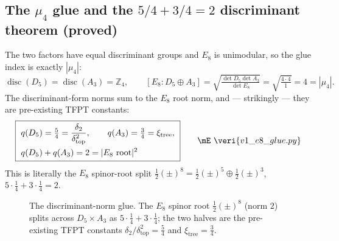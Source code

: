 \documentclass[11pt,a4paper]{article}
\newcommand{\dtop}{\delta_{\mathrm{top}}}
\newcommand{\dtwo}{\delta_2}
\theoremstyle{definition}
\begin{document}
\subsection{The $\mu_4$ glue and the $5/4+3/4=2$ discriminant theorem (proved)}
The two factors have equal discriminant groups and $E_8$ is unimodular, so the glue index is exactly
$|\mu_4|$:
\begin{equation}
  \operatorname{disc}(D_5)=\operatorname{disc}(A_3)=\mathbb Z_4,\qquad
  [E_8:D_5\oplus A_3]=\sqrt{\tfrac{\det D_5\det A_3}{\det E_8}}=\sqrt{\tfrac{4\cdot4}{1}}=4=|\mu_4| .
\end{equation}
The discriminant-form norms sum to the $E_8$ root norm, and --- strikingly --- they are pre-existing
TFPT constants:
\begin{equation}
  \boxed{\ \begin{aligned}
    &q(D_5)=\tfrac54=\frac{\dtwo}{\dtop^2},\qquad q(A_3)=\tfrac34=\xi_{\mathrm{tree}},\\
    &q(D_5)+q(A_3)=2=|\text{$E_8$ root}|^2
  \end{aligned}\ }\qquad\mE\ \veri{v1\_e8\_glue.py}
\end{equation}
This is literally the $E_8$ spinor-root split $\tfrac12(\pm)^8=\tfrac12(\pm)^5\oplus\tfrac12(\pm)^3$,
$5\cdot\tfrac14+3\cdot\tfrac14=2$.

\begin{figure}[ht]
\centering
{}
\caption{The discriminant-norm glue. The $E_8$ spinor root $\tfrac12(\pm)^8$ (norm $2$) splits across
$D_5\times A_3$ as $5\cdot\tfrac14+3\cdot\tfrac14$; the two halves are the pre-existing TFPT constants
$\delta_2/\delta_{\mathrm{top}}^2=\tfrac54$ and $\xi_{\mathrm{tree}}=\tfrac34$.}
\label{fig:gluenorm}
\end{figure}
\end{document}
